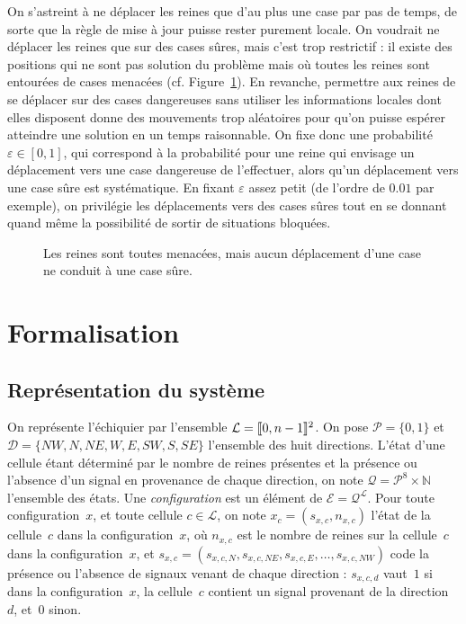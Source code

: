 \documentclass[11pt, openany, a4paper]{article}
\newcommand{\cg }{[\kern-0.15em [}
\newcommand{\cd}{]\kern-0.15em]}
\newcommand{\N}{\mathbb{N}}
\newcommand{\La}{\mathcal{L}}
\newcommand{\D}{\mathcal{D}}
\newcommand{\E}{\mathcal{E}}
\begin{document}
On s'astreint à ne déplacer les reines  que d'au plus une case par pas de temps,
de sorte que la règle de mise  à jour puisse rester purement locale. On voudrait
ne déplacer les reines que sur des  cases sûres, mais c'est trop restrictif : il
existe des  positions qui ne  sont pas solution  du problème mais où  toutes les
reines  sont  entourées de  cases  menacées  (cf. Figure~\ref{fig:blocage}).  En
revanche, permettre  aux reines  de se déplacer  sur des cases  dangereuses sans
utiliser les informations locales dont elles disposent donne des mouvements trop
aléatoires  pour  qu'on  puisse  espérer  atteindre une  solution  en  un  temps
raisonnable.  On  fixe  donc   une  probabilité  $\varepsilon  \in  [0,1]$,  qui
correspond à la probabilité pour une  reine qui envisage un déplacement vers une
case dangereuse de  l'effectuer, alors qu'un déplacement vers  une case sûre est
systématique.  En fixant  $\varepsilon$ assez  petit (de  l'ordre de  $0.01$ par
exemple), on privilégie les déplacements vers des cases sûres tout en se donnant
quand même la possibilité de sortir de situations bloquées.

\begin{figure}
\centering

\newgame
{}
\notationoff
\showboard
\caption{Les reines sont toutes menacées, mais aucun déplacement d'une case ne conduit à une case sûre.}
\label{fig:blocage}
\end{figure}

\section{Formalisation}

\subsection{Représentation du système}

\noindent
On représente l'échiquier par l'ensemble $\La = \cg 0, n-1\cd^2$. On pose
$\mathcal{P} = \{0,1\}$ et \linebreak $\D = \{NW,N,NE,W,E,SW,S,SE\}$ l'ensemble des huit directions. L'état d'une cellule étant déterminé par le nombre de reines présentes et la présence ou l'absence d'un signal en provenance de chaque direction, on note $\mathcal{Q} = {\mathcal{P}^8}\times\N$ l'ensemble des états. Une \emph{configuration} est un élément de $\E=\mathcal{Q}^\La$. Pour toute configuration~$x$, et toute cellule $c \in \La$, on note $x_c = (s_{x, c}, n_{x, c})$ l'état de la cellule~$c$ dans la configuration~$x$, où $n_{x,c}$ est le nombre de reines sur la cellule~$c$ dans la configuration~$x$, et $s_{x,c} = (s_{x,c,N}, s_{x,c,NE}, s_{x,c,E}, \ldots, s_{x,c,NW})$ code la présence ou l'absence de signaux venant de chaque direction : $s_{x,c,d}$ vaut~$1$ si dans la configuration~$x$, la cellule~$c$ contient un signal provenant de la direction~$d$, et~$0$ sinon.
\end{document}
